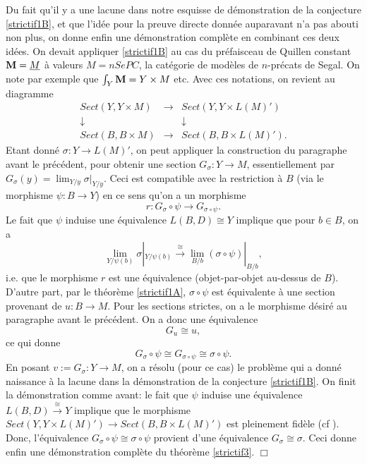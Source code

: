 \documentclass[12pt]{article}
\newcommand{\eop}{\hfill $\Box$\vspace{.1in}}
\newcommand{\mm}{{\bf M}}
\begin{document}
Du fait qu'il y a une lacune dans notre esquisse de d\'emonstration de la
conjecture \ref{strictif1B}, et que l'id\'ee pour la preuve directe donn\'ee
auparavant n'a pas abouti non plus, on donne enfin une
d\'emonstration compl\`ete en combinant ces deux id\'ees. On devait appliquer
\ref{strictif1B} au cas du pr\'efaisceau de Quillen constant $\mm =
\underline{M}$
\`a valeurs $M=nSePC$, la cat\'egorie de mod\`eles de $n$-pr\'ecats de Segal.
On note par exemple que $\int _Y\mm = Y\times M$ etc.  Avec ces notations, on
revient au diagramme
$$
\begin{array}{ccc}
Sect (Y, Y\times M ) & \rightarrow & Sect (Y, Y\times L(M )')\\
\downarrow && \downarrow \\
Sect (B, B\times M )&\rightarrow & Sect (B, B\times L(M )').
\end{array}
$$
Etant donn\'e $\sigma : Y\rightarrow L(M)'$,
on peut appliquer la construction
du paragraphe avant le pr\'ec\'edent, pour obtenir une section $G_{\sigma} :
Y\rightarrow
M$, essentiellement par $G_{\sigma}(y)= \lim _{Y/y} \sigma |_{Y/y}$. Ceci est
compatible avec la restriction \`a $B$ (via le morphisme $\psi :
B\rightarrow Y$) en ce sens qu'on a un morphisme
$$
r:G_{\sigma} \circ  \psi \rightarrow G_{\sigma \circ \psi }.
$$
Le fait que $\psi$ induise une \'equivalence $L(B,D)\cong Y$ implique
que pour $b\in B$, on a
$$
\lim _{Y/\psi (b)}\sigma |_{Y/\psi (b)}\stackrel{\cong}{\rightarrow}
\lim _{B/b}(\sigma \circ \psi )|_{B/b},
$$
i.e. que le morphisme $r$ est une \'equivalence (objet-par-objet au-dessus de
$B$). D'autre part, par le th\'eor\`eme \ref{strictif1A}, $\sigma
\circ \psi $ est \'equivalente \`a une section provenant de $u: B\rightarrow M$.
Pour les sections strictes, on a le morphisme d\'esir\'e au paragraphe
avant le pr\'ec\'edent. On a donc une \'equivalence
$$
G_u \cong u,
$$
ce qui donne
$$
G_{\sigma} \circ \psi \cong G_{\sigma \circ \psi} \cong \sigma \circ \psi .
$$
En posant $v:= G_{\sigma} : Y\rightarrow M$, on a r\'esolu (pour ce cas) le
probl\`eme  qui a donn\'e naissance \`a la lacune dans la d\'emonstration de la
conjecture \ref{strictif1B}. On finit la d\'emonstration comme avant: le
fait que
$\psi$ induise une \'equivalence $L(B,D)\stackrel{\cong}{\rightarrow} Y$
implique que le morphisme $Sect (Y,Y\times L(M)')\rightarrow Sect(B, B\times
L(M)')$ est pleinement fid\`ele (cf \cite{DwyerKanDiags}).
Donc, l'\'equivalence $G_{\sigma}\circ \psi\cong \sigma \circ \psi$ provient
d'une \'equivalence $G_{\sigma} \cong \sigma$.
Ceci donne enfin une d\'emonstration compl\`ete du th\'eor\`eme \ref{strictif3}.
\eop
\end{document}
